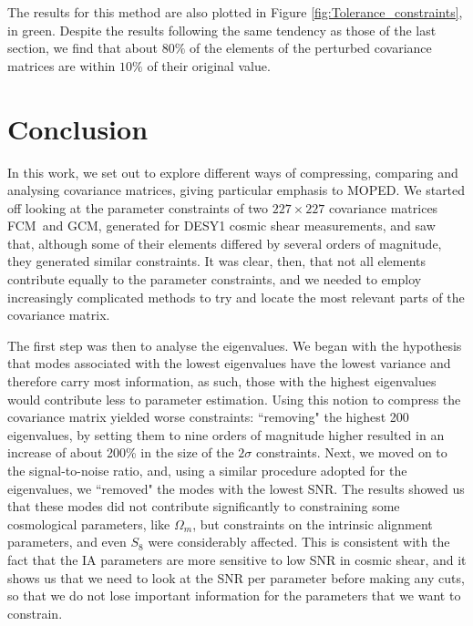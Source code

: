 \documentclass[twocolumn]{\docclass}
\newcommand{\rf}[1]{Figure \ref{fig:#1}}
\newcommand\full{FCM}
\newcommand\gaussian{GCM}
\begin{document}
	The results for this method are also plotted in \rf{Tolerance_constraints}, in green. Despite the results following the same tendency as those of the last section, we find that about $80\%$ of the elements of the perturbed covariance matrices are within $10\%$ of their original value.
	
	\section{Conclusion}
	\label{sec:conclusion}
	
	In this work, we set out to explore different ways of compressing, comparing and analysing covariance matrices, giving particular emphasis to MOPED. We started off looking at the parameter constraints of two $227 \times 227$ covariance matrices \full\ and \gaussian, generated for DESY1 cosmic shear measurements, and saw that, although some of their elements differed by several orders of magnitude, they generated similar constraints. It was clear, then, that not all elements contribute equally to the parameter constraints, and we needed to employ increasingly complicated methods to try and locate the most relevant parts of the covariance matrix.
	
	The first step was then to analyse the eigenvalues. We began with the hypothesis that modes associated with the lowest eigenvalues have the lowest variance and therefore carry most information, as such, those with the highest eigenvalues would contribute less to parameter estimation. Using this notion to compress the covariance matrix yielded worse constraints: ``removing" the highest 200 eigenvalues, by setting them to nine orders of magnitude higher resulted in an increase of about 200\% in the size of the $2 \sigma$ constraints. Next, we moved on to the signal-to-noise ratio, and, using a similar procedure adopted for the eigenvalues, we ``removed" the modes with the lowest SNR. The results showed us that these modes did not contribute significantly to constraining some cosmological parameters, like $\Omega_m$, but constraints on the intrinsic alignment parameters, and even $S_8$ were considerably affected. This is consistent with the fact that the IA parameters are more sensitive to low SNR in cosmic shear, and it shows us that we need to look at the SNR per parameter before making any cuts, so that we do not lose important information for the parameters that we want to constrain.
	
\end{document}
